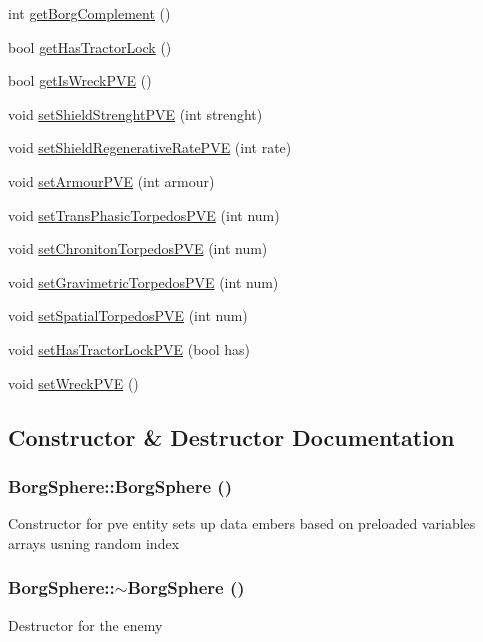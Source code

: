 \begin{DoxyCompactItemize}
int \hyperlink{classBorgSphere_a93dea9d86166e31a47bcce6f57d31b22}{getBorgComplement} ()
\item 
bool \hyperlink{classBorgSphere_aa9ba40319ff0a585222a290e57409891}{getHasTractorLock} ()
\item 
bool \hyperlink{classBorgSphere_a325c849451f5f67ba32d07f93a49a0b0}{getIsWreckPVE} ()
\item 
void \hyperlink{classBorgSphere_a579ab6dc3cb1118ed07a6deb42aa6efa}{setShieldStrenghtPVE} (int strenght)
\item 
void \hyperlink{classBorgSphere_aab1b504e0fd34caae8e74cbe5bddc4dc}{setShieldRegenerativeRatePVE} (int rate)
\item 
void \hyperlink{classBorgSphere_a05cb3b566bae945876f16ba41720746e}{setArmourPVE} (int armour)
\item 
void \hyperlink{classBorgSphere_aabcf70cfb1cb902c44206c6cfb20b159}{setTransPhasicTorpedosPVE} (int num)
\item 
void \hyperlink{classBorgSphere_a46e2416080d4e546645ae88c3a6c47d3}{setChronitonTorpedosPVE} (int num)
\item 
void \hyperlink{classBorgSphere_a9f2faa73e4f5ffee824ac4fa2e66670d}{setGravimetricTorpedosPVE} (int num)
\item 
void \hyperlink{classBorgSphere_a6d1e29d992a4afc48f125e7fff1d89f8}{setSpatialTorpedosPVE} (int num)
\item 
void \hyperlink{classBorgSphere_af53789c3cd02dfb98bfb23e3f91a3822}{setHasTractorLockPVE} (bool has)
\item 
void \hyperlink{classBorgSphere_add9fba918808e2183004ece0a488c854}{setWreckPVE} ()
\end{DoxyCompactItemize}


\subsection{Constructor \& Destructor Documentation}
\hypertarget{classBorgSphere_a78ccec8f5d5f1da244b25bec7daebf3a}{
\subsubsection[{BorgSphere}]{\setlength{\rightskip}{0pt plus 5cm}BorgSphere::BorgSphere ()}}
\label{d6/ddd/classBorgSphere_a78ccec8f5d5f1da244b25bec7daebf3a}
Constructor for pve entity sets up data embers based on preloaded variables arrays usning random index \hypertarget{classBorgSphere_aa858deaede825f3c2baeddb1cd9fe6a4}{
\subsubsection[{$\sim$BorgSphere}]{\setlength{\rightskip}{0pt plus 5cm}BorgSphere::$\sim$BorgSphere ()}}
\label{d6/ddd/classBorgSphere_aa858deaede825f3c2baeddb1cd9fe6a4}
Destructor for the enemy 

